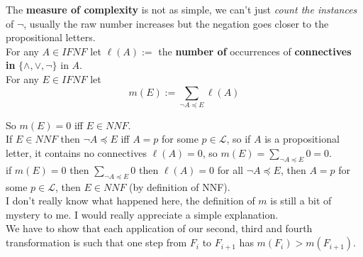 	The \textbf{measure of complexity} is not as simple, we can't just \textit{count the instances} of $\neg$, usually the raw number increases but the negation goes closer to the propositional letters.\\

	For any $A \in IFNF$ let $\ell(A) :=$ the \textbf{number of} occurrences of \textbf{connectives in} $\{\wedge, \vee, \neg\}$ in $A$.\\

	For any $E \in IFNF$ let
	$$m (E):= \sum_{\neg A \preceq E} \ell(A)$$

	So $m(E) = 0$ iff $E \in NNF$.\\

	If $E \in NNF$ then $\neg A \preceq E$ iff $A = p$ for some $p \in \mathcal{L}$, so if $A$ is a propositional letter, it contains no connectives $\ell (A) = 0$, so $m(E) = \sum_{\neg A \preceq E} 0 = 0$.\\

	if $m(E) = 0$ then $\sum_{\neg A \preceq E} 0$ then $\ell(A) = 0$ for all $\neg A \preceq E$, then $A = p$ for some $p \in \mathcal{L}$, then $E \in NNF$ (by definition of NNF).\\

	I don't really know what happened here, the definition of $m$ is still a bit of mystery to me. I would really appreciate a simple explanation.\\

	We have to show that each application of our second, third and fourth transformation is such that one step from $F_i$ to $F_{i+1}$ has $m(F_i) > m(F_{i+1})$.\\

